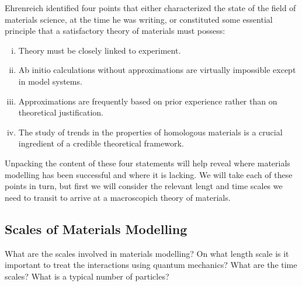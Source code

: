 Ehrenreich identified four points that either characterized the state 
of the field of materials science, at the time he was writing, 
or constituted some essential principle 
that a satisfactory theory of materials must possess:
%
\begin{enumerate}[i)]
\label{en:ehrenreich}
\item Theory must be closely linked to experiment.
\item Ab initio calculations without approximations are virtually impossible 
      except in model systems.
\item Approximations are frequently based on prior experience rather 
      than on theoretical justification.
\item The study of trends in the properties of homologous materials 
      is a crucial ingredient of a credible theoretical framework.
\end{enumerate}
%
Unpacking the content of these four statements will help reveal where 
materials modelling has been successful and where it is lacking.
We will take each of these points in turn, but first we will consider 
the relevant lengt and time scales we need to transit to arrive at a macroscopich
theory of materials.

\subsection{Scales of Materials Modelling}
What are the scales involved in materials modelling?
On what length scale is it important to treat the interactions
using quantum mechanics? What are the time scales? 
What is a typical number of particles?

